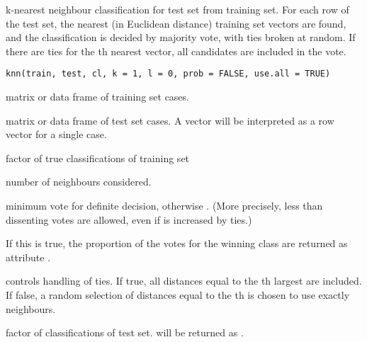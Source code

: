 \begin{Description}\relax
k-nearest neighbour classification for test set from training set. For
each row of the test set, the  nearest (in Euclidean distance)
training set vectors are found, and the classification is decided by
majority vote, with ties broken at random. If there are ties for the
th nearest vector, all candidates are included in the vote.
\end{Description}
\begin{Usage}
\begin{verbatim}
knn(train, test, cl, k = 1, l = 0, prob = FALSE, use.all = TRUE)
\end{verbatim}
\end{Usage}
\begin{Arguments}
\begin{ldescription}
\item[\code{train}] matrix or data frame of training set cases.

\item[\code{test}] matrix or data frame of test set cases. A vector will be interpreted
as a row vector for a single case.

\item[\code{cl}] factor of true classifications of training set

\item[\code{k}] number of neighbours considered.

\item[\code{l}] minimum vote for definite decision, otherwise . (More
precisely, less than  dissenting votes are allowed, even if 
is increased by ties.)

\item[\code{prob}] If this is true, the proportion of the votes for the winning class
are returned as attribute .

\item[\code{use.all}] controls handling of ties. If true, all distances equal to the th
largest are included. If false, a random selection of distances
equal to the th is chosen to use exactly  neighbours.

\end{ldescription}
\end{Arguments}
\begin{Value}
factor of classifications of test set.  will be returned as .
\end{Value}
